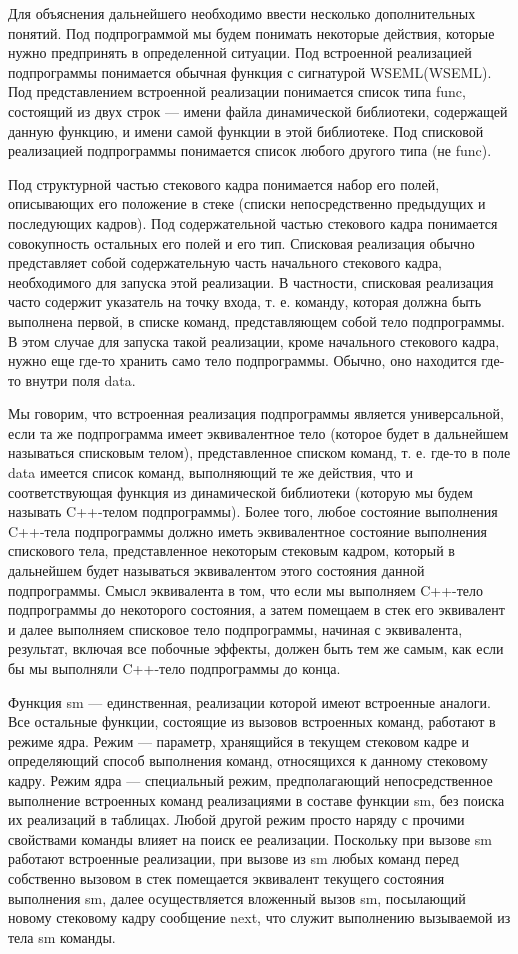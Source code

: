 \documentclass{report}
\begin{document}
    Для объяснения дальнейшего необходимо ввести несколько дополнительных понятий. Под подпрограммой мы будем понимать некоторые действия, которые нужно предпринять в определенной ситуации. Под встроенной реализацией подпрограммы понимается обычная функция с сигнатурой WSEML(WSEML). Под представлением встроенной реализации понимается список типа func, состоящий из двух строк --- имени файла динамической библиотеки, содержащей данную функцию, и имени самой функции в этой библиотеке. Под списковой реализацией подпрограммы понимается список любого другого типа (не func).

    Под структурной частью стекового кадра понимается набор его полей, описывающих его положение в стеке (списки непосредственно предыдущих и последующих кадров). Под содержательной частью стекового кадра понимается совокупность остальных его полей и его тип. Списковая реализация обычно представляет собой содержательную часть начального стекового кадра, необходимого для запуска этой реализации. В частности, списковая реализация часто содержит указатель на точку входа, т. е. команду, которая должна быть выполнена первой, в списке команд, представляющем собой тело подпрограммы. В этом случае для запуска такой реализации, кроме начального стекового кадра, нужно еще где-то хранить само тело подпрограммы. Обычно, оно находится где-то внутри поля data.

    Мы говорим, что встроенная реализация подпрограммы является универсальной, если та же подпрограмма имеет эквивалентное тело (которое будет в дальнейшем называться списковым телом), представленное списком команд, т. е. где-то в поле data имеется список команд, выполняющий те же действия, что и соответствующая функция из динамической библиотеки (которую мы будем называть C++-телом подпрограммы). Более того, любое состояние выполнения C++-тела подпрограммы должно иметь эквивалентное состояние выполнения спискового тела, представленное некоторым стековым кадром, который в дальнейшем будет называться эквивалентом этого состояния данной подпрограммы. Смысл эквивалента в том, что если мы выполняем C++-тело подпрограммы до некоторого состояния, а затем помещаем в стек его эквивалент и далее выполняем списковое тело подпрограммы, начиная с эквивалента, результат, включая все побочные эффекты, должен быть тем же самым, как если бы мы выполняли C++-тело подпрограммы до конца.

    Функция sm --- единственная, реализации которой имеют встроенные аналоги. Все остальные функции, состоящие из вызовов встроенных команд, работают в режиме ядра. Режим --- параметр, хранящийся в текущем стековом кадре и определяющий способ выполнения команд, относящихся к данному стековому кадру. Режим ядра --- специальный режим, предполагающий непосредственное выполнение встроенных команд реализациями в составе функции sm, без поиска их реализаций в таблицах. Любой другой режим просто наряду с прочими свойствами команды влияет на поиск ее реализации. Поскольку при вызове sm работают встроенные реализации, при вызове из sm любых команд перед собственно вызовом в стек помещается эквивалент текущего состояния выполнения sm, далее осуществляется вложенный вызов sm, посылающий новому стековому кадру сообщение next, что служит выполнению вызываемой из тела sm команды.
\end{document}
